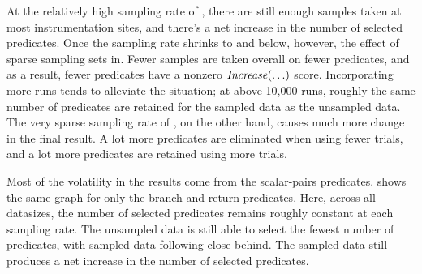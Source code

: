 At the relatively high sampling rate of
, there are still enough samples taken at most
instrumentation sites, and there's a net increase in the number of
selected predicates.  Once the sampling rate shrinks to
 and below, however, the effect of sparse
sampling sets in.  Fewer samples are taken overall on fewer predicates,
and as a result, fewer predicates have a nonzero $\mbox{\textit{Increase}}(\ldots)$ score.
Incorporating more runs tends to alleviate the situation; at above
10,000 runs, roughly the same number of predicates are retained for
the  sampled data as the unsampled data.  The very
sparse sampling rate of , on the other hand,
causes much more change in the final result.  A lot more predicates
are eliminated when using fewer trials, and a lot more predicates are
retained using more trials.

Most of the volatility in the results come from the scalar-pairs
predicates.   shows the same graph for
only the branch and return predicates.  Here, across all datasizes,
the number of selected predicates remains roughly constant at each
sampling rate.  The unsampled data is still able to select the fewest
number of predicates, with  sampled data following
close behind.  The  sampled data still produces a
net increase in the number of selected predicates.

